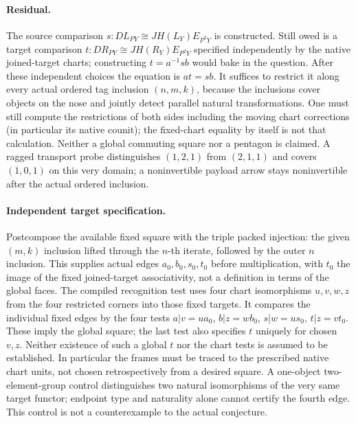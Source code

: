 \paragraph{Residual.} The source comparison $s:D L_{P Y}\cong JH(L_Y)E_{P^2Y}$ is constructed.
Still owed is a target comparison $t:D R_{P Y}\cong JH(R_Y)E_{P^2Y}$
specified independently by the native joined-target charts; constructing $t=a^{-1}s b$ would bake in the question.
After these independent choices the equation is $a t=s b$. It suffices to
restrict it along every actual ordered tag inclusion $(n,m,k)$, because
the inclusions cover objects on the nose and jointly detect parallel natural
transformations. One must still compute the restrictions of both sides
including the moving chart corrections (in particular its native counit);
the fixed-chart equality by itself is not that calculation. Neither a global
commuting square nor a pentagon is claimed. A ragged transport probe
distinguishes $(1,2,1)$ from $(2,1,1)$ and covers $(1,0,1)$ on this
very domain; a noninvertible payload arrow stays noninvertible after
the actual ordered inclusion.


\paragraph{Independent target specification.} Postcompose the available
fixed square with the triple packed injection: the given $(m,k)$ inclusion
lifted through the $n$-th iterate, followed by the outer $n$ inclusion.
This supplies actual edges $a_0,b_0,s_0,t_0$ before multiplication, with
$t_0$ the image of the fixed joined-target associativity, not a definition
in terms of the global faces. The compiled recognition test uses four
chart isomorphisms $u,v,w,z$ from the four restricted corners into those
fixed targets. It compares the individual fixed edges by the four tests
$a|v=ua_0$, $b|z=wb_0$, $s|w=us_0$, $t|z=vt_0$. These imply
the global square; the last test also specifies $t$ uniquely for chosen
$v,z$. Neither existence of such a global $t$ nor the chart tests is
assumed to be established. In particular the frames must be traced to
the prescribed native chart units, not chosen retrospectively from a
desired square. A one-object two-element-group control distinguishes two
natural isomorphisms of the very same target functor; endpoint type and
naturality alone cannot certify the fourth edge. This control is not a
counterexample to the actual conjecture.

